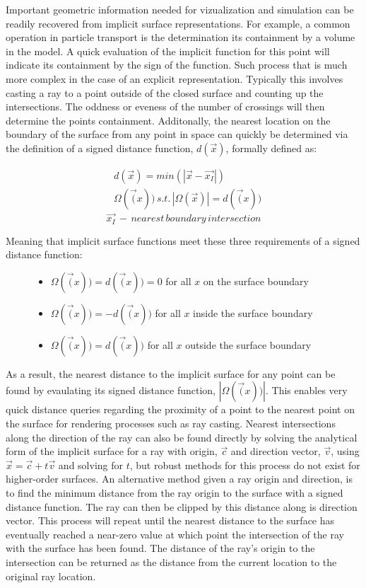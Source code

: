 \documentclass[12pt, a4paper]{article}
\begin{document}
Important geometric information needed for vizualization and simulation can be readily recovered from implicit surface representations. For example, a common operation in particle transport is the determination its containment by a volume in the model. A quick evaluation of the implicit function for this point will indicate its containment by the sign of the function. Such process that is much more complex in the case of an explicit representation. Typically this involves casting a ray to a point outside of the closed surface and counting up the intersections. The oddness or eveness of the number of crossings will then determine the points containment. Additonally, the nearest location on the boundary of the surface from any point in space can quickly be determined via the definition of a signed distance function, $d(\vec{x})$, formally defined as:

\begin{align}
  & d(\vec{x}) = min(|\vec{x} - \vec{x_{I}}|) \\
  & \Omega(\vec(x))  \,s.t.  \,|\Omega(\vec{x})| = d(\vec(x)) 
\end{align}
\begin{equation*}
  \vec{x_{I}} \,- \,nearest \, boundary \,intersection
\end{equation*}

Meaning that implicit surface functions meet these three requirements of a signed distance function:

\begin{figure}[H]
  \begin{itemize}
  \item $ \Omega(\vec(x)) = d(\vec(x)) = 0 $ for all $x$ on the surface boundary
  \item $ \Omega(\vec(x)) = -d(\vec(x)) $ for all $x$ inside the surface boundary
  \item $ \Omega(\vec(x)) = d(\vec(x)) $ for all $x$ outside the surface boundary
  \end{itemize}
\end{figure}

As a result, the nearest distance to the implicit surface for any point can be found by evaulating its signed distance function, $|\Omega(\vec(x))|$. This enables very quick distance queries regarding the proximity of a point to the nearest point on the surface for rendering processes such as ray casting. Nearest intersections along the direction of the ray can also be found directly by solving the analytical form of the implicit surface for a ray with origin, $\vec{c}$ and direction vector, $\vec{v}$, using  $\vec{x} = \vec{c} + t\vec{v}$ and solving for $t$, but robust methods for this process do not exist for higher-order surfaces. An alternative method given a ray origin and direction, is to find the minimum distance from the ray origin to the surface with a signed distance function. The ray can then be clipped by this distance along is direction vector. This process will repeat until the nearest distance to the surface has eventually reached a near-zero value at which point the intersection of the ray with the surface has been found. The distance of the ray's origin to the intersection can be returned as the distance from the current location to the original ray location.
\end{document}
